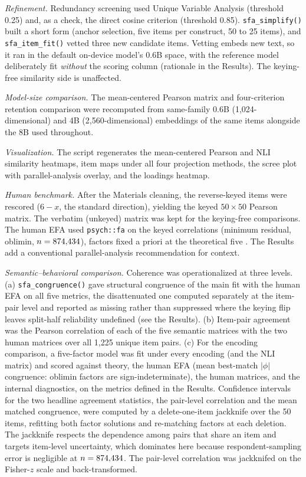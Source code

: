 \emph{Refinement.} Redundancy screening used Unique Variable Analysis (threshold 0.25) and, as a check, the direct cosine criterion (threshold 0.85). \texttt{sfa\_simplify()} built a short form (anchor selection, five items per construct, 50 to 25 items), and \texttt{sfa\_item\_fit()} vetted three new candidate items. Vetting embeds new text, so it ran in the default on-device model's 0.6B space, with the reference model deliberately fit \emph{without} the scoring column (rationale in the Results). The keying-free similarity side is unaffected.

\emph{Model-size comparison.} The mean-centered Pearson matrix and four-criterion retention comparison were recomputed from same-family 0.6B (1,024-dimensional) and 4B (2,560-dimensional) embeddings of the same items alongside the 8B used throughout.

\emph{Visualization.} The script regenerates the mean-centered Pearson and NLI similarity heatmaps, item maps under all four projection methods, the scree plot with parallel-analysis overlay, and the loadings heatmap.

\emph{Human benchmark.} After the Materials cleaning, the \valNRev{} reverse-keyed items were rescored ($6 - x$, the standard direction), yielding the keyed $50 \times 50$ Pearson matrix. The verbatim (unkeyed) matrix was kept for the keying-free comparisons. The human EFA used \texttt{psych::fa} \citep{revelle-2026} on the keyed correlations (minimum residual, oblimin, $n = 874{,}434$), factors fixed a priori at the theoretical five \citep{goldberg-1990}. The Results add a conventional parallel-analysis recommendation for context.

\emph{Semantic--behavioral comparison.} Coherence was operationalized at three levels. (a) \texttt{sfa\_congruence()} gave structural congruence of the main fit with the human EFA on all five metrics, the disattenuated one computed separately at the item-pair level and reported as missing rather than suppressed where the keying flip leaves split-half reliability undefined (see the Results). (b) Item-pair agreement was the Pearson correlation of each of the five semantic matrices with the two human matrices over all 1,225 unique item pairs. (c) For the encoding comparison, a five-factor model was fit under every encoding (and the NLI matrix) and scored against theory, the human EFA (mean best-match $|\phi|$ congruence: oblimin factors are sign-indeterminate), the human matrices, and the internal diagnostics, on the metrics defined in the Results. Confidence intervals for the two headline agreement statistics, the pair-level correlation and the mean matched congruence, were computed by a delete-one-item jackknife over the 50 items, refitting both factor solutions and re-matching factors at each deletion. The jackknife respects the dependence among pairs that share an item and targets item-level uncertainty, which dominates here because respondent-sampling error is negligible at $n = 874{,}434$. The pair-level correlation was jackknifed on the Fisher-$z$ scale and back-transformed.
